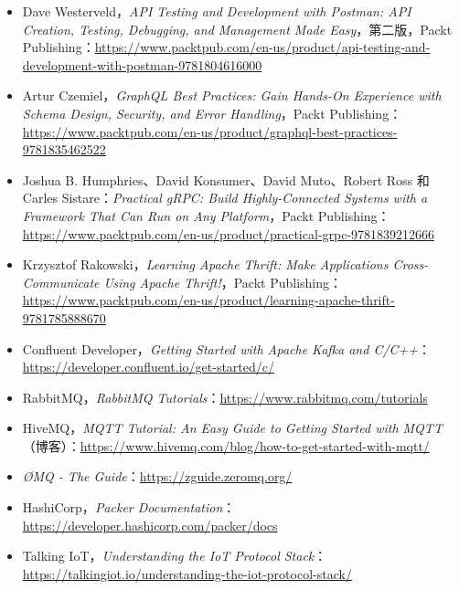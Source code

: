 \begin{itemize}
\item Dave Westerveld，\emph{API Testing and Development with Postman: API Creation, Testing, Debugging, and Management Made Easy}，第二版，Packt Publishing：\href{https://www.packtpub.com/en-us/product/api-testing-and-development-with-postman-9781804616000}{https://www.packtpub.com/en-us/product/api-testing-and-development-with-postman-9781804616000}
\item Artur Czemiel，\emph{GraphQL Best Practices: Gain Hands-On Experience with Schema Design, Security, and Error Handling}，Packt Publishing：\href{https://www.packtpub.com/en-us/product/graphql-best-practices-9781835462522}{https://www.packtpub.com/en-us/product/graphql-best-practices-9781835462522}
\item Joshua B. Humphries、David Konsumer、David Muto、Robert Ross 和 Carles Sistare：\emph{Practical gRPC: Build Highly-Connected Systems with a Framework That Can Run on Any Platform}，Packt Publishing：\href{https://www.packtpub.com/en-us/product/practical-grpc-9781839212666}{https://www.packtpub.com/en-us/product/practical-grpc-9781839212666}
\item Krzysztof Rakowski，\emph{Learning Apache Thrift: Make Applications Cross-Communicate Using Apache Thrift!}，Packt Publishing：\href{https://www.packtpub.com/en-us/product/learning-apache-thrift-9781785888670}{https://www.packtpub.com/en-us/product/learning-apache-thrift-9781785888670}
\item Confluent Developer，\emph{Getting Started with Apache Kafka and C/C++}：\href{https://developer.confluent.io/get-started/c/}{https://developer.confluent.io/get-started/c/}
\item RabbitMQ，\emph{RabbitMQ Tutorials}：\href{https://www.rabbitmq.com/tutorials}{https://www.rabbitmq.com/tutorials}
\item HiveMQ，\emph{MQTT Tutorial: An Easy Guide to Getting Started with MQTT }（博客）：\href{https://www.hivemq.com/blog/how-to-get-started-with-mqtt/}{https://www.hivemq.com/blog/how-to-get-started-with-mqtt/}
\item \emph{ØMQ - The Guide}：\href{https://zguide.zeromq.org/}{https://zguide.zeromq.org/}
\item HashiCorp，\emph{Packer Documentation}：\href{https://developer.hashicorp.com/packer/docs}{https://developer.hashicorp.com/packer/docs}
\item Talking IoT，\emph{Understanding the IoT Protocol Stack}：\href{https://talkingiot.io/understanding-the-iot-protocol-stack/}{https://talkingiot.io/understanding-the-iot-protocol-stack/}

\end{itemize}
